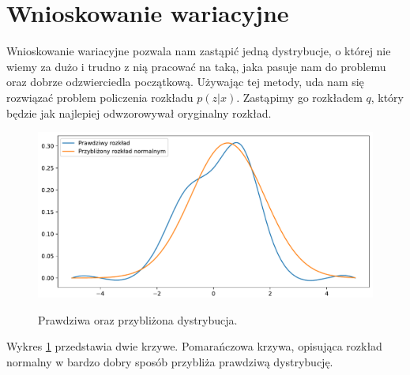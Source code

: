 \documentclass[a4paper,12pt]{book} %
\begin{document}
\section{Wnioskowanie wariacyjne}
Wnioskowanie wariacyjne pozwala nam zastąpić jedną dystrybucje, o której nie wiemy za dużo i trudno z nią pracować na taką, jaka pasuje nam do problemu oraz dobrze odzwierciedla początkową. Używając tej metody, uda nam się rozwiązać problem policzenia rozkładu $p(z|x)$. Zastąpimy go rozkładem $q$, który będzie jak najlepiej odwzorowywał oryginalny rozkład. 
\begin{figure}[h!]
	\centering
	\includegraphics[width=12cm]{approximate.pdf}
	\label{fig:approximate}
	\caption{Prawdziwa oraz przybliżona dystrybucja.}
\end{figure} 

Wykres \ref{fig:approximate} przedstawia dwie krzywe. Pomarańczowa krzywa, opisująca rozkład normalny w bardzo dobry sposób przybliża prawdziwą dystrybucję.
\end{document}

